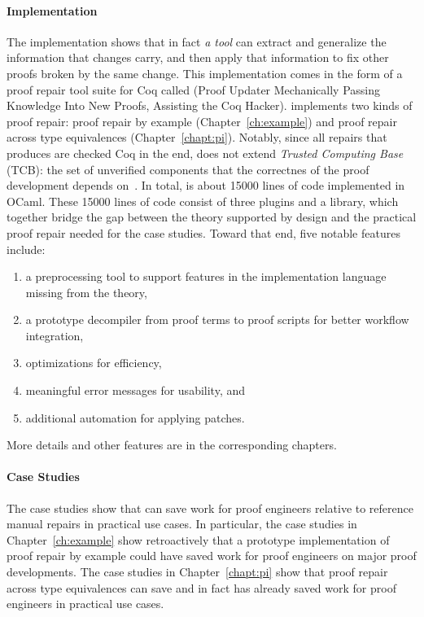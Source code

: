 \paragraph{Implementation}
The implementation shows that in fact \textit{a tool} can extract and generalize the information that changes carry,
and then apply that information to fix other proofs broken by the same change.
This implementation comes in the form of a proof repair tool suite for Coq called \sysnamelong (Proof Updater Mechanically Passing Knowledge Into New Proofs, Assisting the Coq Hacker).
\sysnamelong implements two kinds of proof repair: proof repair by example (Chapter~\ref{ch:example}) %
and proof repair across type equivalences (Chapter~\ref{chapt:pi}). %
Notably, since all repairs that \sysnamelong produces are checked Coq in the end, \sysnamelong does not extend \textit{Trusted Computing Base} (TCB):
the set of unverified components that the correctnes of the proof development depends on~\cite{TODO}. %
In total, \sysnamelong is about 15000 lines of code implemented in OCaml.
These 15000 lines of code consist of three plugins and a library,
which together bridge the gap between the theory supported by design and the practical proof repair needed for the case studies.
Toward that end, five notable features include:

\begin{enumerate}
\item a preprocessing tool to support features in the implementation language missing from the theory,
\item a prototype decompiler from proof terms to proof scripts for better workflow integration,
\item optimizations for efficiency,
\item meaningful error messages for usability, and
\item additional automation for applying patches. 
\end{enumerate}
More details and other features are in the corresponding chapters. %

\paragraph{Case Studies}
The case studies show that \sysnamelong can save work for proof engineers relative to 
reference manual repairs in practical use cases. %
In particular, the case studies in Chapter~\ref{ch:example} show retroactively that a prototype implementation of proof repair
by example could have saved work for proof engineers on major proof developments.
The case studies in Chapter~\ref{chapt:pi} show that proof repair across type equivalences can save
and in fact has already saved work for proof engineers in practical use cases.


